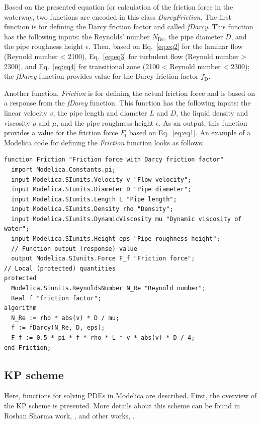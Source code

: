 \documentclass[%
]{USN-PhD}
\begin{document}
Based on the presented equation for calculation of the friction force in the waterway, two functions are encoded in this class \emph{DarcyFriction}. The first function is for defining the Darcy friction factor and called \emph{fDarcy}. This function has the following inputs: the Reynolds' number $N_\mathrm{Re}$, the pipe diameter $D$, and the pipe roughness height $\epsilon$. Then, based on Eq.~\ref{eq:eq2} for the laminar flow (Reynold number < 2100), Eq.~\ref{eq:eq3} for turbulent flow (Reynold number > 2300), and Eq.~\ref{eq:eq4} for transitional zone (2100 < Reynold number < 2300); the \emph{fDarcy} function provides value for the Darcy friction factor $f_\mathrm{D}$.

Another function, \emph{Friction} is for defining the actual friction force and is based on a response from the \emph{fDarcy} function. This function has the following inputs: the linear velocity $v$, the pipe length and diameter $L$ and $D$, the liquid density and viscosity $\rho$ and $\mu$, and the pipe roughness height $\epsilon$. As an output, this function provides a value for the friction force $F_\mathrm{f}$ based on Eq.~\ref{eq:eq1}. An example of a Modelica code for defining the \emph{Friction} function looks as follows:

\begin{lstlisting}[language = modelica]
function Friction "Friction force with Darcy friction factor"
  import Modelica.Constants.pi;
  input Modelica.SIunits.Velocity v "Flow velocity";
  input Modelica.SIunits.Diameter D "Pipe diameter";
  input Modelica.SIunits.Length L "Pipe length";
  input Modelica.SIunits.Density rho "Density";
  input Modelica.SIunits.DynamicViscosity mu "Dynamic viscosity of water";
  input Modelica.SIunits.Height eps "Pipe roughness height";
  // Function output (response) value
  output Modelica.SIunits.Force F_f "Friction force";
// Local (protected) quantities
protected
  Modelica.SIunits.ReynoldsNumber N_Re "Reynold number";
  Real f "friction factor";
algorithm
  N_Re := rho * abs(v) * D / mu;
  f := fDarcy(N_Re, D, eps);
  F_f := 0.5 * pi * f * rho * L * v * abs(v) * D / 4;
end Friction;
\end{lstlisting}

\subsection{KP scheme}

Here, functions for solving PDEs in Modelica are described. First, the overview of the KP scheme is presented. More details about this scheme can be found in Roshan Sharma work, \cite{Sha:15}, and other works, \cite{Vyt:15,Vyt:17}.
\end{document}

